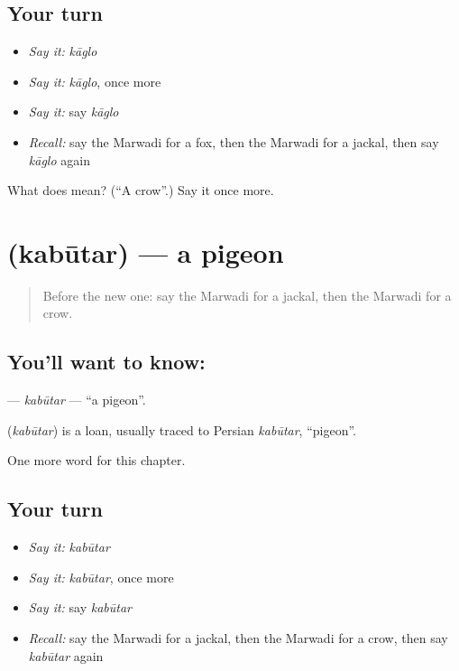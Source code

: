 \subsection*{Your turn}
\begin{itemize}
\raggedright
  \item \emph{Say it:} \emph{kāglo}
  \item \emph{Say it:} \emph{kāglo}, once more
  \item \emph{Say it:} say \emph{kāglo}
  \item \emph{Recall:} say the Marwadi for a fox, then the Marwadi for a jackal, then say \emph{kāglo} again
\end{itemize}

\begin{tcolorbox}[breakable,colback=teal!4,colframe=teal!35!black,title={Before you move on}]
What does  mean? (\textquotedblleft{}A crow\textquotedblright{}.) Say it once more.
\end{tcolorbox}
\section[\texorpdfstring{\mw{कबूतर} (kabūtar)}{कबूतर (kabūtar)}]{ (kabūtar) — a pigeon}

\label{lesson:MW-C139-kabutar}



\begin{quote}
Before the new one: say the Marwadi for a jackal, then the Marwadi for a crow.
\end{quote}

\subsection*{You'll want to know: }
\textbf{} — \emph{kabūtar} — \textquotedblleft{}a pigeon\textquotedblright{}.

\begin{cousinweb}
\textbf{} (\emph{kabūtar}) is a loan, usually traced to Persian \emph{kabūtar}, \textquotedblleft{}pigeon\textquotedblright{}.
\end{cousinweb}

\begin{grammarlens}[title={What you've built}]
One more word for this chapter.
\end{grammarlens}

\subsection*{Your turn}
\begin{itemize}
\raggedright
  \item \emph{Say it:} \emph{kabūtar}
  \item \emph{Say it:} \emph{kabūtar}, once more
  \item \emph{Say it:} say \emph{kabūtar}
  \item \emph{Recall:} say the Marwadi for a jackal, then the Marwadi for a crow, then say \emph{kabūtar} again
\end{itemize}

